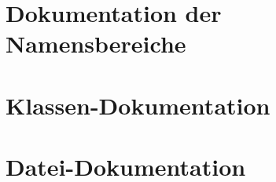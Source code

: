 \documentclass[a4paper]{book}
\begin{document}
\chapter{Dokumentation der Namensbereiche}




\chapter{Klassen-\/Dokumentation}


\chapter{Datei-\/Dokumentation}



















\printindex
\end{document}
